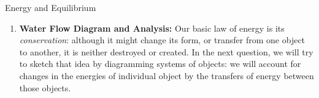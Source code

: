 \documentclass[12pt]{article}
\begin{document}
\begin{center}
{\Large Energy and Equilibrium}
\end{center}

\begin{enumerate}

\item {\bf Water Flow Diagram and Analysis:} Our basic law of energy is its {\em conservation}: although it might change its form, or transfer from one object to another, it is neither destroyed or created.  In the next question, we will try to sketch that idea by diagramming systems of objects: we will account for changes in the energies of individual object by the transfers of energy between those objects. 


\end{enumerate}
\end{document}
